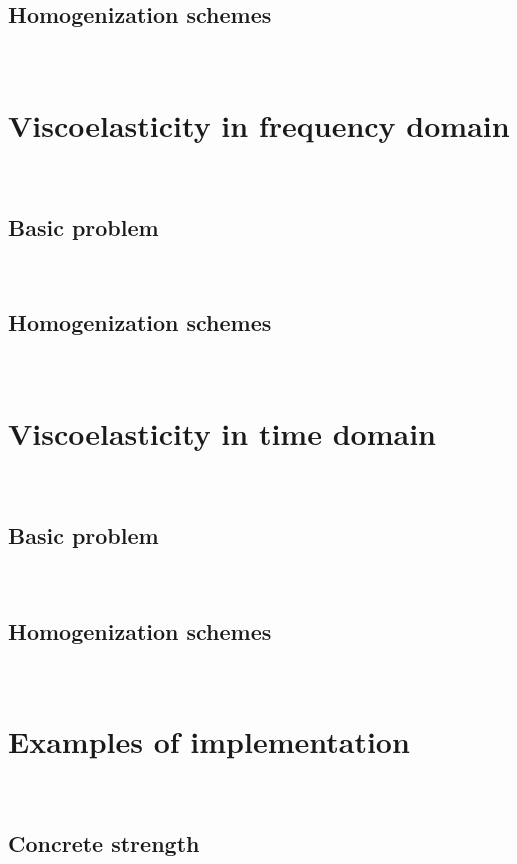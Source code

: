 \documentclass[
  letterpaper,
  DIV=11,
  numbers=noendperiod]{scrreprt}
\begin{document}
\(\,\)

\hypertarget{sec-schemes_deriv}{%
\chapter{Homogenization schemes}\label{sec-schemes_deriv}}

\(\,\)

\part{Viscoelasticity in frequency domain}

\(\,\)

\hypertarget{sec-basics_freq}{%
\chapter{Basic problem}\label{sec-basics_freq}}

\(\,\)

\hypertarget{sec-schemes_freq}{%
\chapter{Homogenization schemes}\label{sec-schemes_freq}}

\(\,\)

\part{Viscoelasticity in time domain}

\(\,\)

\hypertarget{sec-basics_time}{%
\chapter{Basic problem}\label{sec-basics_time}}

\(\,\)

\hypertarget{sec-schemes_time}{%
\chapter{Homogenization schemes}\label{sec-schemes_time}}

\(\,\)

\part{Examples of implementation}

\(\,\)

\hypertarget{sec-concrete_strength}{%
\chapter{Concrete strength}\label{sec-concrete_strength}}
\end{document}
